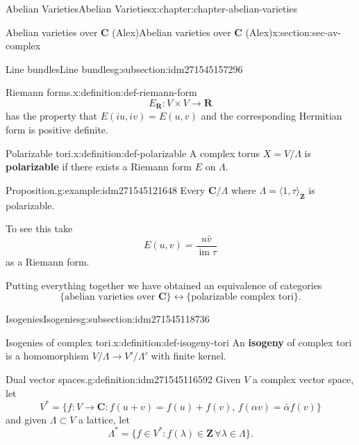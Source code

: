 \documentclass[oneside,10pt,]{book}
\newcommand{\terminology}[1]{\textbf{#1}}
\numberwithin{equation}{section}
\newcommand{\ZZ}{\mathbf{Z}}
\newcommand{\RR}{\mathbf{R}}
\newcommand{\CC}{\mathbf{C}}
\DeclareMathOperator{\im}{im}
\begin{document}
\begin{chapterptx}{Abelian Varieties}{}{Abelian Varieties}{}{}{x:chapter:chapter-abelian-varieties}
\begin{sectionptx}{Abelian varieties over \(\CC\) (Alex)}{}{Abelian varieties over \(\CC\) (Alex)}{}{}{x:section:sec-av-complex}
\begin{subsectionptx}{Line bundles}{}{Line bundles}{}{}{g:subsection:idm271545157296}
\begin{definition}{Riemann forms.}{x:definition:def-riemann-form}
\begin{equation*}
E_\RR \colon V\times V\to \RR
\end{equation*}
has the property that \(E(iu,iv) = E(u,v)\) and  the corresponding Hermitian form is positive definite.%
\end{definition}
\begin{definition}{Polarizable tori.}{x:definition:def-polarizable}%
A complex torus \(X = V/\Lambda\) is \terminology{polarizable} if there exists a Riemann form \(E\) on \(\Lambda\).%
\end{definition}
\begin{example}{Proposition.}{g:example:idm271545121648}%
Every \(\CC/\Lambda\) where \(\Lambda = \langle 1,\tau\rangle_{\ZZ}\) is polarizable.%
\par
To see this take%
\begin{equation*}
E(u,v) = \frac{u\bar v}{\im \tau}
\end{equation*}
as a Riemann form.%
\end{example}
Putting everything together we have obtained an equivalence of categories%
\begin{equation*}
\{\text{abelian varieties over } \CC\} \leftrightarrow \{\text{polarizable complex tori}\}\text{.}
\end{equation*}
%
\end{subsectionptx}
%
%
\typeout{************************************************}
\typeout{************************************************}
%
\begin{subsectionptx}{Isogenies}{}{Isogenies}{}{}{g:subsection:idm271545118736}
\begin{definition}{Isogenies of complex tori.}{x:definition:def-isogeny-tori}%
An \terminology{isogeny} of complex tori is a homomorphism \(V/\Lambda \to V'/\Lambda'\) with finite kernel.%
\end{definition}
\begin{definition}{Dual vector spaces.}{g:definition:idm271545116592}%
Given \(V\) a complex vector space, let%
\begin{equation*}
V^* = \{f\colon V\to \CC : f(u+v) = f(u)+f(v),\,f(\alpha v) = \bar \alpha f(v) \}
\end{equation*}
and given \(\Lambda \subset V\) a lattice, let%
\begin{equation*}
\Lambda^* = \{f\in V^* : f(\lambda) \in \ZZ\,\forall \lambda\in \Lambda\}\text{.}
\end{equation*}
%
\end{definition}

\end{subsectionptx}
\end{sectionptx}
\end{chapterptx}
\end{document}
